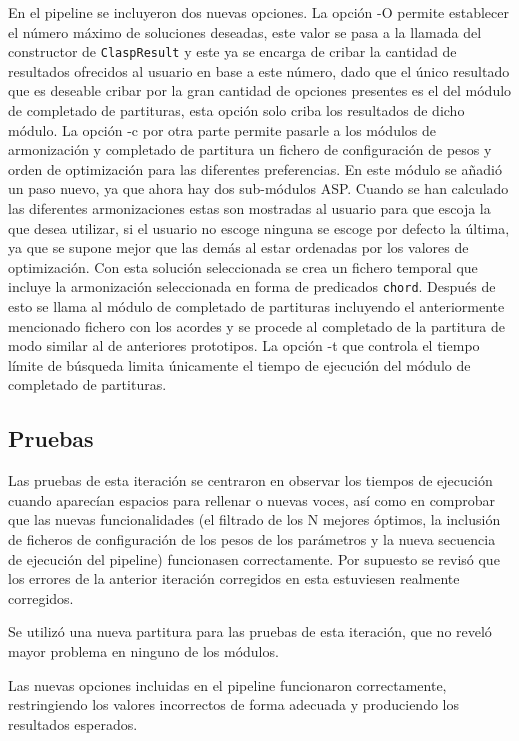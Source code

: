 En el pipeline se incluyeron dos nuevas opciones. La opción -O permite establecer el número máximo de soluciones deseadas, este valor se pasa a la llamada del constructor de \texttt{ClaspResult} y este ya se encarga de cribar la cantidad de resultados ofrecidos al usuario en base a este número, dado que el único resultado que es deseable cribar por la gran cantidad de opciones presentes es el del módulo de completado de partituras, esta opción solo criba los resultados de dicho módulo. La opción -c por otra parte permite pasarle a los módulos de armonización y completado de partitura un fichero de configuración de pesos y orden de optimización para las diferentes preferencias. En este módulo se añadió un paso nuevo, ya que ahora hay dos sub-módulos ASP. Cuando se han calculado las diferentes armonizaciones estas son mostradas al usuario para que escoja la que desea utilizar, si el usuario no escoge ninguna se escoge por defecto la última, ya que se supone mejor que las demás al estar ordenadas por los valores de optimización. Con esta solución seleccionada se crea un fichero temporal que incluye la armonización seleccionada en forma de predicados \texttt{chord}. Después de esto se llama al módulo de completado de partituras incluyendo el anteriormente mencionado fichero con los acordes y se procede al completado de la partitura de modo similar al de anteriores prototipos. La opción -t que controla el tiempo límite de búsqueda limita únicamente el tiempo de ejecución del módulo de completado de partituras.

\subsection{Pruebas}
Las pruebas de esta iteración se centraron en observar los tiempos de ejecución cuando aparecían espacios para rellenar o nuevas voces, así como en comprobar que las nuevas funcionalidades (el filtrado de los N mejores óptimos, la inclusión de ficheros de configuración de los pesos de los parámetros y la nueva secuencia de ejecución del pipeline) funcionasen correctamente. Por supuesto se revisó que los errores de la anterior iteración corregidos en esta estuviesen realmente corregidos.

Se utilizó una nueva partitura para las pruebas de esta iteración, que no reveló mayor problema en ninguno de los módulos.

Las nuevas opciones incluidas en el pipeline funcionaron correctamente, restringiendo los valores incorrectos de forma adecuada y produciendo los resultados esperados.


